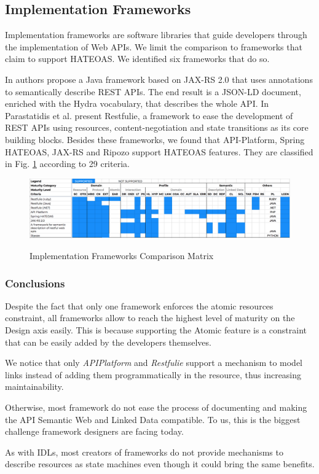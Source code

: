 \subsection{Implementation Frameworks}


Implementation frameworks are software libraries that guide developers through the implementation of Web APIs. We limit the comparison to frameworks that claim to support HATEOAS. We identified six frameworks that do so.

In \cite{salvadori2014framework} authors propose a Java framework based on JAX-RS 2.0 that uses annotations to semantically describe REST APIs. The end result is a JSON-LD document, enriched with the Hydra vocabulary, that describes the whole API. In \cite{parastatidis2010role} Parastatidis et al. present Restfulie, a framework to ease the development of REST APIs using resources, content-negotiation and state transitions as its core building blocks. Besides these frameworks, we found that API-Platform, Spring HATEOAS, JAX-RS and Ripozo support HATEOAS features. They are classified in Fig. \ref{frameworks-matrix} according to 29 criteria.

\begin{figure}[t]
\caption{Implementation Frameworks Comparison Matrix}
\includegraphics[width=1\textwidth]{figures/frameworks.png}
\label{frameworks-matrix}
\end{figure}

\subsubsection*{Conclusions}

Despite the fact that only one framework enforces the atomic resources constraint, all frameworks allow to reach the highest level of maturity on the Design axis easily. This is because supporting the Atomic feature is a constraint that can be easily added by the developers themselves. 

We notice that only \textit{APIPlatform} and \textit{Restfulie} support a mechanism to model links instead of adding them programmatically in the resource, thus increasing maintainability.

Otherwise, most framework do not ease the process of documenting and making the API Semantic Web and Linked Data compatible. To us, this is the biggest challenge framework designers are facing today.

As with IDLs, most creators of frameworks do not provide mechanisms to describe resources as state machines even though it could bring the same benefits.
